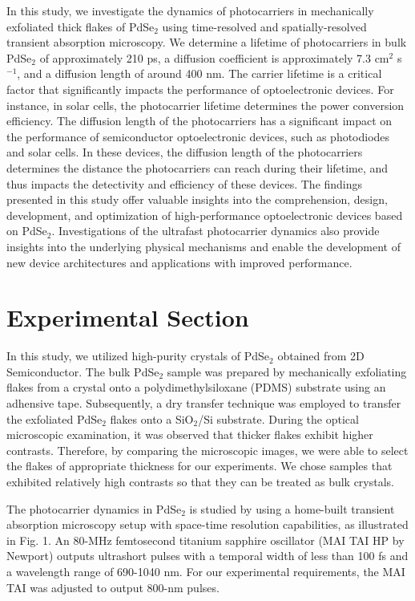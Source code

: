 \documentclass[twoside,twocolumn,9pt]{article}
\begin{document}
In this study, we investigate the dynamics of photocarriers in mechanically exfoliated thick flakes of PdSe$_2$ using time-resolved and spatially-resolved transient absorption microscopy. We determine a lifetime of photocarriers in bulk PdSe$_2$ of approximately 210 ps, a diffusion coefficient is approximately 7.3 cm$^{2}$ s$^{-1}$, and a diffusion length of around 400 nm. The carrier lifetime is a critical factor that significantly impacts the performance of optoelectronic devices. For instance, in solar cells, the photocarrier
lifetime determines the power conversion efficiency. The diffusion length of the photocarriers has a significant impact on the performance of semiconductor optoelectronic devices, such as photodiodes and solar cells. In these devices, the diffusion length of the photocarriers determines the distance the photocarriers can reach during their lifetime, and thus impacts the detectivity and efficiency of these devices. The findings presented in this study offer valuable insights into the comprehension, design, development, and optimization of high-performance optoelectronic devices based on PdSe$_2$. Investigations of the ultrafast photocarrier dynamics also provide insights into the underlying physical mechanisms and enable the development of new device architectures and applications with improved performance.



\section{Experimental Section}
In this study, we utilized high-purity crystals of PdSe$_2$ obtained from 2D Semiconductor. The bulk PdSe$_2$ sample was prepared by mechanically exfoliating flakes from a crystal onto a polydimethylsiloxane (PDMS) substrate using an adhensive tape. Subsequently, a dry transfer technique was employed to transfer the exfoliated PdSe$_2$ flakes onto a SiO$_2$/Si substrate. During the optical microscopic examination, it was observed that thicker flakes exhibit higher contrasts. Therefore, by comparing the microscopic images, we were able to select the flakes of appropriate thickness for our experiments. We chose samples that exhibited relatively high contrasts so that they can be treated as bulk crystals. 

The photocarrier dynamics in PdSe$_2$ is studied by using a home-built transient absorption microscopy setup with space-time resolution capabilities, as illustrated in Fig. 1. An 80-MHz femtosecond titanium sapphire oscillator (MAI TAI HP by Newport) outputs ultrashort pulses with a temporal width of less than 100 fs and a wavelength range of 690-1040 nm. For our experimental requirements, the MAI TAI was adjusted to output 800-nm pulses.
\end{document}
